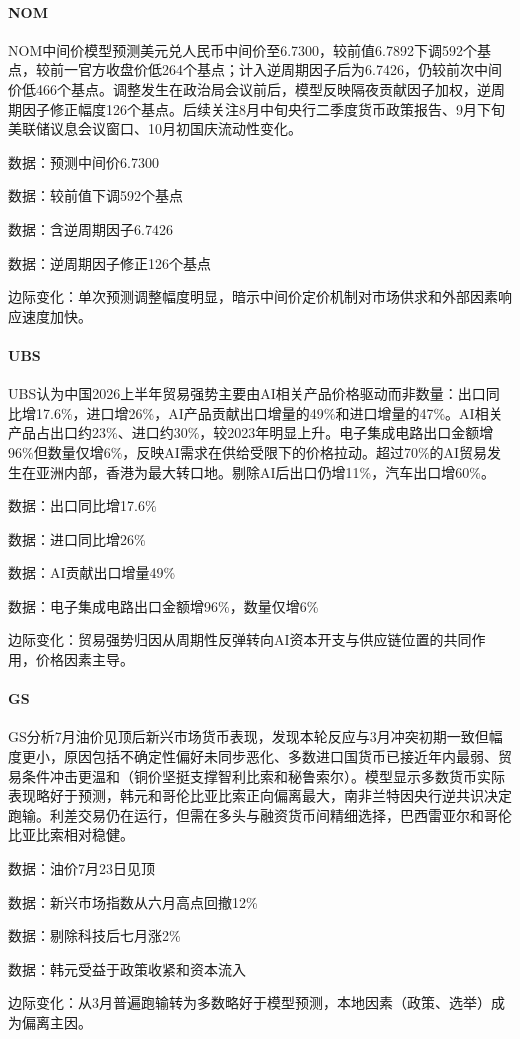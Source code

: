 \documentclass[11pt]{ctexart}
\begin{document}
\paragraph{NOM} NOM中间价模型预测美元兑人民币中间价至6.7300，较前值6.7892下调592个基点，较前一官方收盘价低264个基点；计入逆周期因子后为6.7426，仍较前次中间价低466个基点。调整发生在政治局会议前后，模型反映隔夜贡献因子加权，逆周期因子修正幅度126个基点。后续关注8月中旬央行二季度货币政策报告、9月下旬美联储议息会议窗口、10月初国庆流动性变化。
{\small\color{refgray}数据：预测中间价6.7300\par}
{\small\color{refgray}数据：较前值下调592个基点\par}
{\small\color{refgray}数据：含逆周期因子6.7426\par}
{\small\color{refgray}数据：逆周期因子修正126个基点\par}
{\small\color{refgray}边际变化：单次预测调整幅度明显，暗示中间价定价机制对市场供求和外部因素响应速度加快。\par}
\paragraph{UBS} UBS认为中国2026上半年贸易强势主要由AI相关产品价格驱动而非数量：出口同比增17.6\%，进口增26\%，AI产品贡献出口增量的49\%和进口增量的47\%。AI相关产品占出口约23\%、进口约30\%，较2023年明显上升。电子集成电路出口金额增96\%但数量仅增6\%，反映AI需求在供给受限下的价格拉动。超过70\%的AI贸易发生在亚洲内部，香港为最大转口地。剔除AI后出口仍增11\%，汽车出口增60\%。
{\small\color{refgray}数据：出口同比增17.6\%\par}
{\small\color{refgray}数据：进口同比增26\%\par}
{\small\color{refgray}数据：AI贡献出口增量49\%\par}
{\small\color{refgray}数据：电子集成电路出口金额增96\%，数量仅增6\%\par}
{\small\color{refgray}边际变化：贸易强势归因从周期性反弹转向AI资本开支与供应链位置的共同作用，价格因素主导。\par}
\paragraph{GS} GS分析7月油价见顶后新兴市场货币表现，发现本轮反应与3月冲突初期一致但幅度更小，原因包括不确定性偏好未同步恶化、多数进口国货币已接近年内最弱、贸易条件冲击更温和（铜价坚挺支撑智利比索和秘鲁索尔）。模型显示多数货币实际表现略好于预测，韩元和哥伦比亚比索正向偏离最大，南非兰特因央行逆共识决定跑输。利差交易仍在运行，但需在多头与融资货币间精细选择，巴西雷亚尔和哥伦比亚比索相对稳健。
{\small\color{refgray}数据：油价7月23日见顶\par}
{\small\color{refgray}数据：新兴市场指数从六月高点回撤12\%\par}
{\small\color{refgray}数据：剔除科技后七月涨2\%\par}
{\small\color{refgray}数据：韩元受益于政策收紧和资本流入\par}
{\small\color{refgray}边际变化：从3月普遍跑输转为多数略好于模型预测，本地因素（政策、选举）成为偏离主因。\par}
\end{document}

